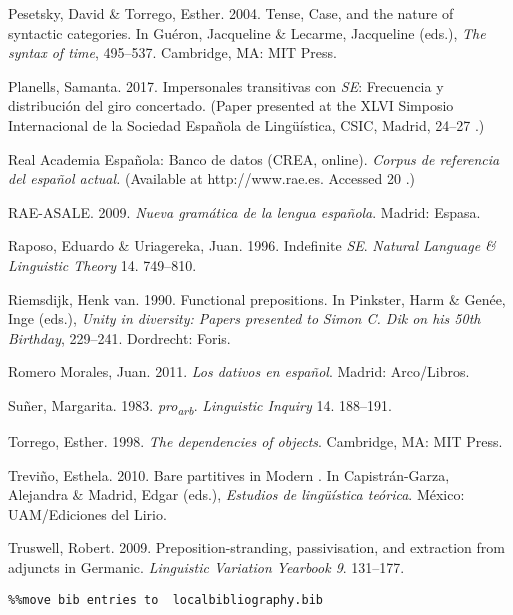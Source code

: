 \documentclass[output=paper]{langsci/langscibook}
\begin{document}
Pesetsky, David \& Torrego, Esther. 2004. Tense, Case, and the nature of syntactic categories. In Guéron, Jacqueline \& Lecarme, Jacqueline (eds.), \textit{The syntax of time}, 495–537. Cambridge, MA: MIT Press.

Planells, Samanta. 2017. Impersonales transitivas con \textit{SE}: Frecuencia y distribución del giro concertado. (Paper presented at the XLVI Simposio Internacional de la Sociedad Española de Lingüística, CSIC, Madrid, 24–27 \citealt{January2017}.)

Real Academia Española: Banco de datos (CREA, online). \textit{Corpus de referencia del español actual.} (Available at http://www.rae.es. Accessed 20 \citealt{April2014}.)

RAE-ASALE. 2009. \textit{Nueva gramática de la lengua española}. Madrid: Espasa.

Raposo, Eduardo \& Uriagereka, Juan. 1996. Indefinite \textit{SE}. \textit{Natural Language \& Linguistic Theory} 14. 749–810.

Riemsdijk, Henk van. 1990. Functional prepositions. In Pinkster, Harm \& Genée, Inge (eds.), \textit{Unity in diversity: Papers presented to} \textit{Simon C. Dik on his 50th Birthday}, 229–241. Dordrecht: Foris.

Romero Morales, Juan. 2011. \textit{Los dativos en español}. Madrid: Arco/Libros.

Suñer, Margarita. 1983. \textit{pro\textsubscript{arb}}. \textit{Linguistic Inquiry} 14. 188–191.

Torrego, Esther. 1998. \textit{The dependencies of objects}. Cambridge, MA: MIT Press.

Treviño, Esthela. 2010. Bare partitives in Modern . In Capistrán-Garza, Alejandra \& Madrid, Edgar (eds.), \textit{Estudios de lingüística teórica}. México: UAM/Ediciones del Lirio.

Truswell, Robert. 2009. Preposition-stranding, passivisation, and extraction from adjuncts in Germanic. \textit{Linguistic Variation Yearbook 9}. 131–177.


\begin{verbatim}%%move bib entries to  localbibliography.bib
\end{verbatim} 

\sloppy
\printbibliography[heading=subbibliography,notkeyword=this] 
\end{document}
